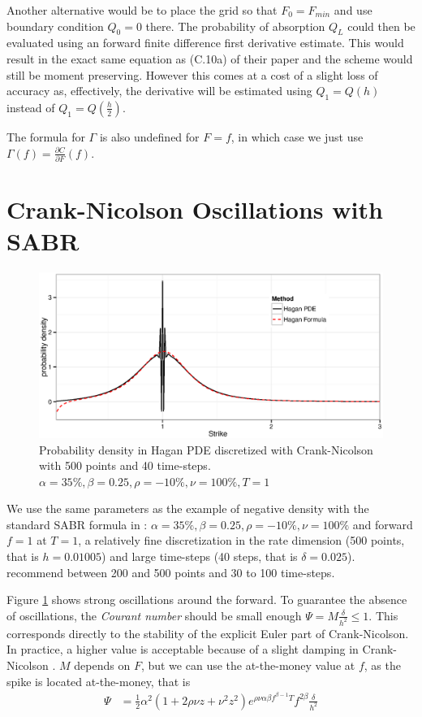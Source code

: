 \documentclass[]{rAMF2e}
\begin{document}
Another alternative would be to place the grid so that $F_0 = F_{min}$ and use boundary condition $Q_0 = 0$ there. The probability of absorption $Q_L$ could then be evaluated using an forward finite difference first derivative estimate. This would result in the exact same equation as (C.10a) of their paper and the scheme would still be moment preserving. However this comes at a cost of a slight loss of accuracy as, effectively, the derivative will be estimated using $Q_1 = Q(h)$ instead of $Q_1 = Q(\frac{h}{2})$.

The formula for $\Gamma$ is also undefined for $F=f$, in which case we just use $\Gamma(f) = \frac{\partial C}{\partial F}(f)$.

\section{Crank-Nicolson Oscillations with SABR}\label{section_cn}
\begin{figure}[htb]
  \begin{center}  
    \includegraphics[width=12cm]{density_hagan_cn_500_40.eps}
  \end{center}
     \caption{\label{fig:density_hagan_cn_500_40} Probability density in Hagan PDE discretized with Crank-Nicolson with 500 points and 40 time-steps. $\alpha=35\%, \beta=0.25, \rho=-10\%, \nu=100\%, T=1$}
\end{figure}

We use the same parameters as the example of negative density with the standard SABR formula in \citep{hagan2013arbitrage}: $\alpha=35\%, \beta=0.25, \rho=-10\%, \nu=100\%$ and forward $f=1$ at $T=1$, a relatively fine discretization in the rate dimension (500 points, that is $h = 0.01005$) and large time-steps (40 steps, that is $\delta=0.025$). \cite{hagan2013arbitrage} recommend between 200 and 500 points and 30 to 100 time-steps.

Figure \ref{fig:density_hagan_cn_500_40} shows strong oscillations around the forward. To guarantee the absence of oscillations, the \emph{Courant number}  should be small enough $\Psi = M \frac{\delta}{h^2}\leq 1$. This corresponds directly to the stability of the explicit Euler part of Crank-Nicolson. In practice, a higher value is acceptable because of a slight damping in Crank-Nicolson \citep{lawson1978extrapolation}. $M$ depends on $F$, but we can use the at-the-money value at $f$, as the spike is located at-the-money, that is 
\begin{align}
\Psi &= \frac{1}{2} \alpha^2 (1+2\rho\nu z+ \nu^2 z^2) e^{\rho\nu\alpha\beta f^{\beta-1} T} f^{2\beta} \frac{\delta}{h^2}
\end{align} 
\end{document}
